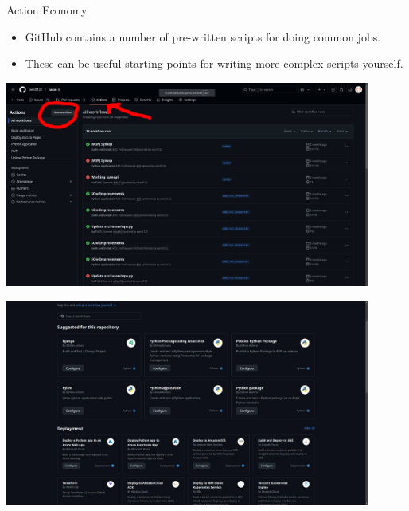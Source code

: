 \documentclass[usenames,dvipsnames]{beamer}
\begin{document}
\begin{frame}{Action Economy}
    \begin{itemize}[<+->]
        \item{}GitHub contains a number of pre-written scripts for doing common jobs.
        \item{}These can be useful starting points for writing more complex scripts yourself.
    \end{itemize}

     {
        \begin{center}
            \includegraphics[width=0.9\textwidth]{findingmarket.jpg}
        \end{center}
    }
     {
        \begin{center}
            \includegraphics[width=0.9\textwidth]{exampleactions.jpg}
        \end{center}
    }
\end{frame}
\end{document}
